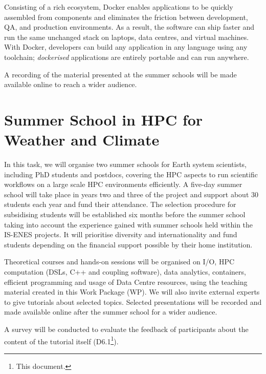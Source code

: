 Consisting of a rich ecosystem, Docker enables applications to be quickly assembled from components and eliminates the friction between development, QA, and production environments. As a result, the software can ship faster and run the same unchanged stack on laptops, data centres, and virtual machines. With Docker, developers can build any application in any language using any toolchain; \textit{dockerised} applications are entirely portable and can run anywhere.

A recording of the material presented at the summer schools will be made available online to reach a wider audience.

\section{Summer School in HPC for Weather and Climate}
\label{sec:tss}

In this task, we will organise two summer schools for Earth system scientists, including PhD students and postdocs, covering the HPC aspects to run scientific workflows on a large scale HPC environments efficiently. A five-day summer school will take place in years two and three of the project and support about 30 students each year and fund their attendance. The selection procedure for subsidising students will be established six months before the summer school taking into account the experience gained with summer schools held within the IS-ENES projects. It will prioritise diversity and internationality and fund students depending on the financial support possible by their home institution.

Theoretical courses and hands-on sessions will be organised on I/O, HPC computation (DSLs, C++ and coupling software), data analytics, containers, efficient programming and usage of Data Centre resources, using the teaching material created in this Work Package (WP). We will also invite external experts to give tutorials about selected topics. Selected presentations will be recorded and made available online after the summer school for a wider audience.

A survey will be conducted to evaluate the feedback of participants about the content of the tutorial itself (D6.1\footnote{This document.}).
